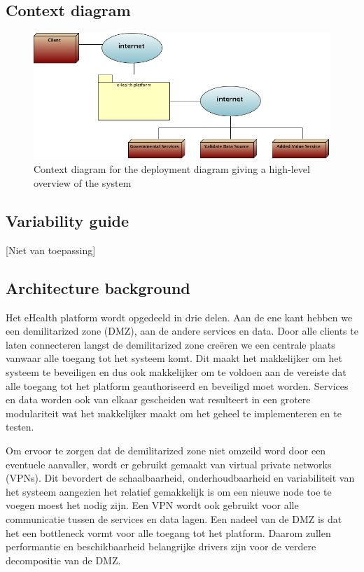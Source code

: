 \documentclass[a4paper,10pt]{article}
\begin{document}
\subsection{Context diagram}
\begin{center}
    \begin{figure}[!h]
      \includegraphics[scale=0.60]{../images/deployment_DMZ_context.jpg}
	\caption{Context diagram for the deployment diagram giving a high-level overview of the system}
    \end{figure}
 \end{center}

\subsection{Variability guide}
[Niet van toepassing]

\subsection{Architecture background}

Het eHealth platform wordt opgedeeld in drie delen. Aan de ene kant hebben we een demilitarized zone (DMZ), aan de andere services en data. Door alle clients te laten connecteren langst de demilitarized zone creëren we een centrale plaats vanwaar alle toegang tot het systeem komt. Dit maakt het makkelijker om het systeem te beveiligen en dus ook makkelijker om te voldoen aan de vereiste dat alle toegang tot het platform geauthoriseerd en beveiligd moet worden. Services en data worden ook van elkaar gescheiden wat resulteert in een grotere modulariteit wat het makkelijker maakt om het geheel te implementeren en te testen.

Om ervoor te zorgen dat de demilitarized zone niet omzeild word door een eventuele aanvaller, wordt er gebruikt gemaakt van virtual private networks (VPNs). Dit bevordert de schaalbaarheid, onderhoudbaarheid en variabiliteit van het systeem aangezien het relatief gemakkelijk is om een nieuwe node toe te voegen moest het nodig zijn. Een VPN wordt ook gebruikt voor alle communicatie tussen de services en data lagen. Een nadeel van de DMZ is dat het een bottleneck vormt voor alle toegang tot het platform. Daarom zullen performantie en beschikbaarheid belangrijke drivers zijn voor de verdere decompositie van de DMZ.
\end{document}
